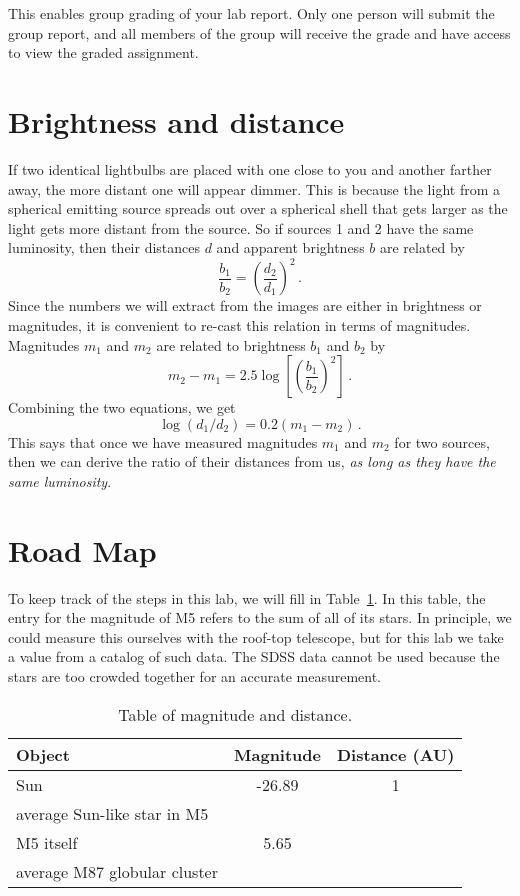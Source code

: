 This enables group grading of your lab report. Only one person will submit the group report, and all members of the group will receive the grade and have access to view the graded assignment.

\section{Brightness and distance}

If two identical lightbulbs are placed with one close to you and another farther away, the more distant one will appear dimmer. This is because the light from a spherical emitting source spreads out over a spherical shell that gets larger as the light gets more distant from the source. So if sources 1 and 2 have the same luminosity, then their distances $d$ and apparent brightness
$b$ are related by
\begin{equation}
\frac{b_1}{b_2} = \left( \frac{d_2}{d_1} \right)^2 \,.
\end{equation}
Since the numbers we will extract from the images are either in brightness or magnitudes,
it is convenient to re-cast this relation in terms of magnitudes. Magnitudes $m_1$ and $m_2$ are
related to brightness $b_1$ and $b_2$ by
\begin{equation}
m_2 - m_1 = 2.5 \log \left[ \left( \frac{b_1}{b_2} \right)^2 \right] \,.
\end{equation}
Combining the two equations, we get
\begin{equation}\label{gc:eq:m-d}
 \log(d_1/d_2) = 0.2 (m_1-m_2) \,.
\end{equation}
This says that once we have measured magnitudes $m_1$ and $m_2$ for two sources, then we can
derive the ratio of their distances from us, \textit{as long as they have the same luminosity}.

\section{Road Map}

To keep track of the steps in this lab, we will fill in Table~\ref{gc:tab:mag}. In this table, the entry for the magnitude of M5 refers to the sum of all of its stars. In
principle, we could measure this ourselves with the roof-top telescope, but for this lab we take
a value from a catalog of such data. The SDSS data cannot be used because the stars
are too crowded together for an accurate measurement.

\begin{table}
	\centering
	\begin{tabular}{l|c|c}
		\toprule
		\textbf{Object} & \textbf{Magnitude} & \textbf{Distance (AU)} \\ \midrule
		Sun & -26.89 & 1 \\\midrule
		average Sun-like star in M5 &  & \\\midrule
		M5 itself & 5.65 & \\\midrule
		average M87 globular cluster & &
		\\ \bottomrule
	\end{tabular}
	\caption{Table of magnitude and distance.}\label{gc:tab:mag}
\end{table}

